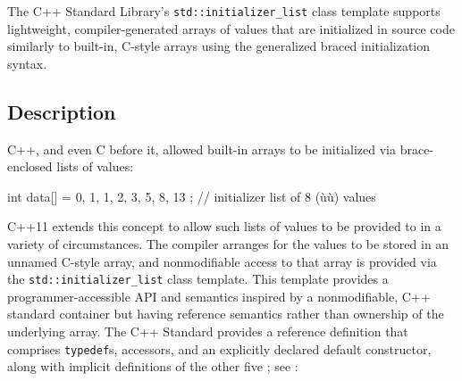 \label{list-initialization:-std::initializer_list<t>}
\setcounter{table}{0}
\setcounter{footnote}{0}
\setcounter{lstlisting}{0}

The C++ Standard Library's \lstinline!std::initializer_list! class
template supports lightweight, compiler-generated arrays of values that
are initialized in source code similarly to built-in, C-style arrays
using the generalized braced initialization syntax.

\subsection[Description]{Description}\label{description}

C++, and even C before it, allowed built-in arrays to be initialized via
brace-enclosed lists of values:

\begin{emcppslisting}
int data[] = { 0, 1, 1, 2, 3, 5, 8, 13 };  // initializer list of 8 (ù{}ù) values
\end{emcppslisting}
    

\noindent C++11 extends this concept to allow such lists of values to be provided
to  in a variety of circumstances. The
compiler arranges for the values to be stored in an unnamed C-style
array, and nonmodifiable access to that array is provided via the
\lstinline!std::initializer_list! class template. This template provides a
programmer-accessible API and semantics inspired by a nonmodifiable, C++
standard container but having reference semantics rather than ownership
of the underlying array. The C++ Standard provides a reference
definition that comprises \lstinline!typedef!s, accessors, and an
explicitly declared default constructor, along with implicit definitions
of the other five ; see : 

